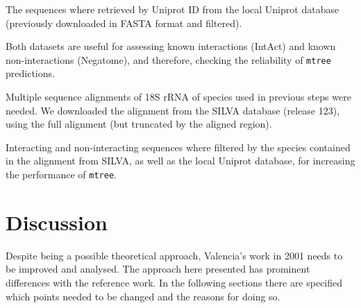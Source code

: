 \documentclass[11pt]{article}
\begin{document}
The sequences where retrieved by Uniprot ID from the local Uniprot database (previously downloaded in FASTA format and filtered). 

Both datasets are useful for assessing known interactions (IntAct) and known non-interactions (Negatome), and therefore, checking the reliability of \texttt{mtree} predictions.

Multiple sequence alignments of 18S rRNA of species used in previous steps were needed. We downloaded the alignment from the SILVA database\cite{SILVA} (release 123), using the full alignment (but truncated by the aligned region).

Interacting and non-interacting sequences where filtered by the species contained in the alignment from SILVA, as well as the local Uniprot database, for increasing the performance of \texttt{mtree}.



\section{Discussion}
Despite being a possible theoretical approach, Valencia's work in 2001\cite{Pazos2001} needs to be improved and analysed. The approach here presented has prominent differences with the reference work. In the following sections there are specified which points needed to be changed and the reasons for doing so.
\end{document}
